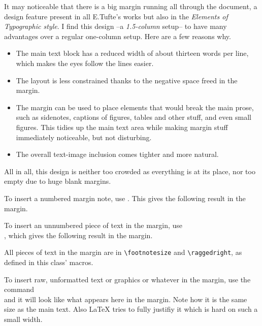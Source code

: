 \documentclass[raggedright, twoside, 11pt, colorful]{tufte-style-article}
\begin{document}
It may noticeable that there is a big margin running all through the document, a design feature present in all E.Tufte's works but also in the \textit{Elements of Typographic style}. I find this design --a \textit{1.5-column} setup-- to have many advantages over a regular one-column setup. Here are a few reasons why.
\begin{itemize}
	\tightlist
	\item The main text block has a reduced width of about thirteen words per line, which makes the eyes follow the lines easier.

	\item The layout is less constrained thanks to the negative space freed in the margin.

	\item The margin can be used to place elements that would break the main prose, such as sidenotes, captions of figures, tables and other stuff, and even small figures. This tidies up the main text area while making margin stuff immediately noticeable, but not disturbing.

	\item The overall text-image inclusion comes tighter and more natural.
\end{itemize}
All in all, this design is neither too crowded as everything is at its place, nor too empty due to huge blank margins.

To insert a numbered margin note, use . This gives the following result in the margin.

To insert an unnumbered piece of text in the margin, use\\\noindent{}, which gives the following result in the margin.

All pieces of text in the margin are in \texttt{\textbackslash footnotesize} and \texttt{\textbackslash raggedright}, as defined in this class' macros.

To insert raw, unformatted text or graphics or whatever in the margin, use the command\\  and it will look like what appears here in the margin. Note how it is the same size as the main text. Also \LaTeX{} tries to fully justifiy it which is hard on such a small width.
\end{document}
